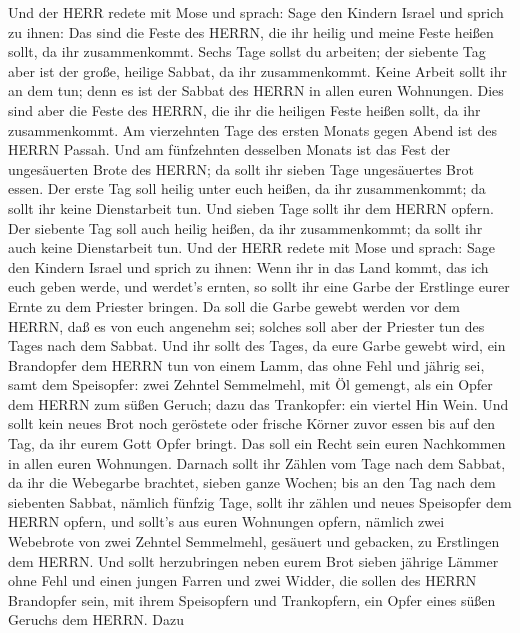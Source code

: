  Und der HERR redete mit Mose und sprach:  Sage
den Kindern Israel und sprich zu ihnen: Das sind die Feste des HERRN,
die ihr heilig und meine Feste heißen sollt, da ihr zusammenkommt.
 Sechs Tage sollst du arbeiten; der siebente Tag aber ist
der große, heilige Sabbat, da ihr zusammenkommt. Keine Arbeit sollt ihr
an dem tun; denn es ist der Sabbat des HERRN in allen euren Wohnungen.
 Dies sind aber die Feste des HERRN, die ihr die heiligen
Feste heißen sollt, da ihr zusammenkommt.  Am vierzehnten
Tage des ersten Monats gegen Abend ist des HERRN Passah. 
Und am fünfzehnten desselben Monats ist das Fest der ungesäuerten Brote
des HERRN; da sollt ihr sieben Tage ungesäuertes Brot essen.
 Der erste Tag soll heilig unter euch heißen, da ihr
zusammenkommt; da sollt ihr keine Dienstarbeit tun.  Und
sieben Tage sollt ihr dem HERRN opfern. Der siebente Tag soll auch
heilig heißen, da ihr zusammenkommt; da sollt ihr auch keine
Dienstarbeit tun.  Und der HERR redete mit Mose und sprach:
 Sage den Kindern Israel und sprich zu ihnen: Wenn ihr in
das Land kommt, das ich euch geben werde, und werdet's ernten, so sollt
ihr eine Garbe der Erstlinge eurer Ernte zu dem Priester bringen.
 Da soll die Garbe gewebt werden vor dem HERRN, daß es von
euch angenehm sei; solches soll aber der Priester tun des Tages nach dem
Sabbat.  Und ihr sollt des Tages, da eure Garbe gewebt
wird, ein Brandopfer dem HERRN tun von einem Lamm, das ohne Fehl und
jährig sei,  samt dem Speisopfer: zwei Zehntel Semmelmehl,
mit Öl gemengt, als ein Opfer dem HERRN zum süßen Geruch; dazu das
Trankopfer: ein viertel Hin Wein.  Und sollt kein neues
Brot noch geröstete oder frische Körner zuvor essen bis auf den Tag, da
ihr eurem Gott Opfer bringt. Das soll ein Recht sein euren Nachkommen in
allen euren Wohnungen.  Darnach sollt ihr Zählen vom Tage
nach dem Sabbat, da ihr die Webegarbe brachtet, sieben ganze Wochen;
 bis an den Tag nach dem siebenten Sabbat, nämlich fünfzig
Tage, sollt ihr zählen und neues Speisopfer dem HERRN opfern,
 und sollt's aus euren Wohnungen opfern, nämlich zwei
Webebrote von zwei Zehntel Semmelmehl, gesäuert und gebacken, zu
Erstlingen dem HERRN.  Und sollt herzubringen neben eurem
Brot sieben jährige Lämmer ohne Fehl und einen jungen Farren und zwei
Widder, die sollen des HERRN Brandopfer sein, mit ihrem Speisopfern und
Trankopfern, ein Opfer eines süßen Geruchs dem HERRN.  Dazu
